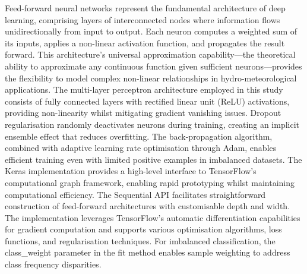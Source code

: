 \documentclass[nhess, manuscript]{copernicus}
\begin{document}
Feed-forward neural networks represent the fundamental architecture of deep learning, comprising layers of interconnected nodes where information flows unidirectionally from input to output. Each neuron computes a weighted sum of its inputs, applies a non-linear activation function, and propagates the result forward. This architecture's universal approximation capability—the theoretical ability to approximate any continuous function given sufficient neurons—provides the flexibility to model complex non-linear relationships in hydro-meteorological applications. The multi-layer perceptron architecture employed in this study consists of fully connected layers with rectified linear unit (ReLU) activations, providing non-linearity whilst mitigating gradient vanishing issues. Dropout regularisation randomly deactivates neurons during training, creating an implicit ensemble effect that reduces overfitting. The back-propagation algorithm, combined with adaptive learning rate optimisation through Adam, enables efficient training even with limited positive examples in imbalanced datasets. The Keras implementation provides a high-level interface to TensorFlow's computational graph framework, enabling rapid prototyping whilst maintaining computational efficiency. The Sequential API facilitates straightforward construction of feed-forward architectures with customisable depth and width. The implementation leverages TensorFlow's automatic differentiation capabilities for gradient computation and supports various optimisation algorithms, loss functions, and regularisation techniques. For imbalanced classification, the class\_weight parameter in the fit method enables sample weighting to address class frequency disparities.
\end{document}
